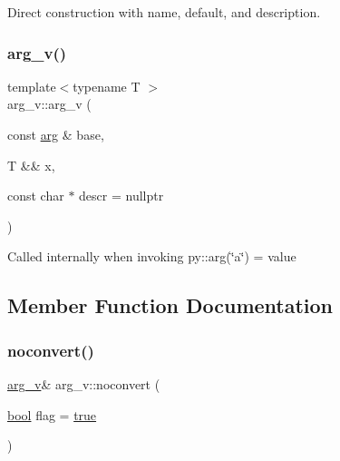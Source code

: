 Direct construction with name, default, and description. 

\mbox{\label{structarg__v_a0a3a669c2b644bf122c3363d88c5dea6}} 
\subsubsection{\texorpdfstring{arg\_v()}{arg\_v()}\hspace{0.1cm}{\footnotesize\ttfamily [2/2]}}
{\footnotesize\ttfamily template$<$typename T $>$ \\
arg\+\_\+v\+::arg\+\_\+v (\begin{DoxyParamCaption}\item[{const \mbox{\hyperlink{structarg}{arg}} \&}]{base,  }\item[{T \&\&}]{x,  }\item[{const char $\ast$}]{descr = {\ttfamily nullptr} }\end{DoxyParamCaption})\hspace{0.3cm}{\ttfamily [inline]}}



Called internally when invoking {\ttfamily py\+::arg(\char`\"{}a\char`\"{}) = value} 



\subsection{Member Function Documentation}
\mbox{\label{structarg__v_a018e928b16cc3e83065740a92a490d07}} 
\subsubsection{\texorpdfstring{noconvert()}{noconvert()}}
{\footnotesize\ttfamily \mbox{\hyperlink{structarg__v}{arg\+\_\+v}}\& arg\+\_\+v\+::noconvert (\begin{DoxyParamCaption}\item[{\mbox{\hyperlink{asdl_8h_af6a258d8f3ee5206d682d799316314b1}{bool}}}]{flag = {\ttfamily \mbox{\hyperlink{asdl_8h_af6a258d8f3ee5206d682d799316314b1a08f175a5505a10b9ed657defeb050e4b}{true}}} }\end{DoxyParamCaption})\hspace{0.3cm}{\ttfamily [inline]}}



